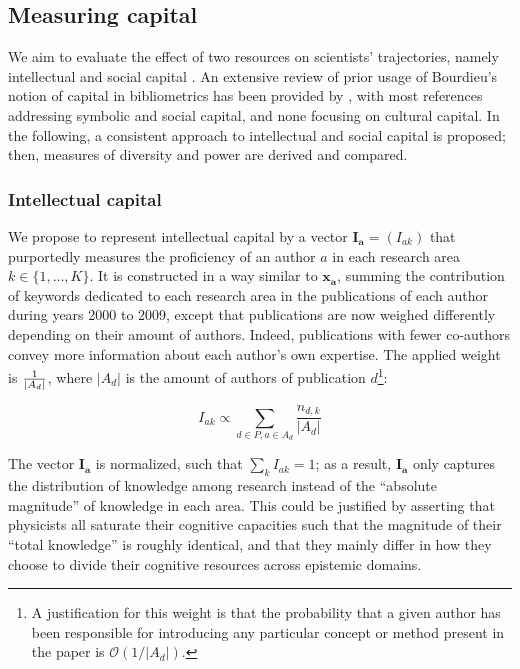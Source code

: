 \documentclass{article}
\begin{document}
\subsection{\label{sec:capital}Measuring capital}

We aim to evaluate the effect of two resources on scientists' trajectories, namely intellectual and social capital \citep{Bourdieu1986}. An extensive review of prior usage of Bourdieu's notion of capital in bibliometrics has been provided by \citet[p.~198-200]{Schirone2023}, with most references addressing symbolic and social capital, and none focusing on cultural capital. In the following, a consistent approach to intellectual and social capital is proposed; then, measures of diversity and power are derived and compared.

\subsubsection{Intellectual capital}

We propose to represent intellectual capital by a vector $\bm{I_a}=(I_{ak})$ that purportedly measures the proficiency of an author $a$ in each research area $k \in \{1,\dots,K\}$. It is constructed in a way similar to $\bm{x_{a}}$, summing the contribution of keywords dedicated to each research area in the publications of each author during years 2000 to 2009, except that publications are now weighed differently depending on their amount of authors. Indeed, publications with fewer co-authors convey more information about each author's own expertise. The applied weight is $1 \over |A_d|$, where $|A_d|$ is the amount of authors of publication $d$\footnote{A justification for this weight is that the probability that a given author has been responsible for introducing any particular concept or method present in the paper is $\mathcal{O}(1/|A_d|)$. }:

\begin{equation}
    I_{ak} \propto  \sum_{d\in P,a\in A_d} \dfrac{n_{d,k}}{|A_d|}
\end{equation}

The vector $\bm{I_a}$ is normalized, such that $\sum_k I_{ak}=1$; as a result, $\bm{I_a}$ only captures the distribution of knowledge among research instead of the ``absolute magnitude'' of knowledge in each area. This could be justified by asserting that physicists all saturate their cognitive capacities such that the magnitude of their ``total knowledge'' is roughly identical, and that they mainly differ in how they choose to divide their cognitive resources across epistemic domains.
\end{document}
